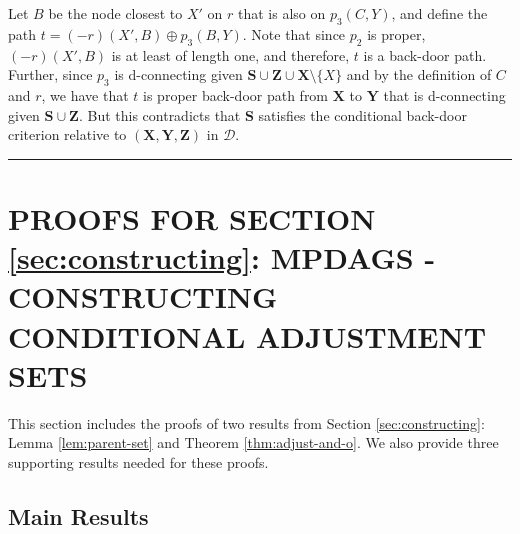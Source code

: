 \documentclass[twoside]{article}
\newcommand{\mb}[1]{\mathbf{#1}}
\newcommand{\g}[1][G]{\mathcal{#1}}
\newenvironment{proofof}[1][]{\begin{trivlist}
\item[\hskip \labelsep {\bfseries Proof of #1.}]}{\hfill\BlackBox\end{trivlist}}
\newcommand{\BlackBox}{\rule{1.5ex}{1.5ex}}
\begin{document}
\begin{proofof}[Lemma \ref{lem:gbc-cbc}]
    Let $B$ be the node closest to $X'$ on $r$ that is also on $p_3(C,Y)$, and define the path $t=(-r)(X',B) \oplus p_3(B,Y)$. Note that since $p_2$ is proper, $(-r)(X',B)$ is at least of length one, and therefore, $t$ is a back-door path. Further, since $p_3$ is d-connecting given $\mb{S} \cup \mb{Z} \cup \mb{X} \setminus \{X\}$ and by the definition of $C$ and $r$, we have that $t$ is proper back-door path from $\mb{X}$ to $\mb{Y}$ that is d-connecting given $\mb{S} \cup \mb{Z}$. But this contradicts that $\mb{S}$ satisfies the conditional back-door criterion relative to $(\mb{X,Y,Z})$ in $\g[D]$.
\end{proofof}
























\section{PROOFS FOR SECTION \ref{sec:constructing}: MPDAGS - CONSTRUCTING CONDITIONAL ADJUSTMENT SETS}
\label{supp:constructing}

This section includes the proofs of two results from Section \ref{sec:constructing}: Lemma \ref{lem:parent-set} and Theorem \ref{thm:adjust-and-o}. We also provide three supporting results needed for these proofs.




\subsection{Main Results}
\end{document}
